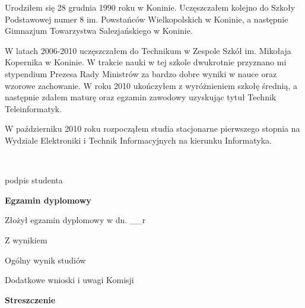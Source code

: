 \begin{titlepage}
    \indent 
    Urodziłem się 28 grudnia 1990 roku w Koninie. Uczęszczałem
    kolejno do Szkoły Podstawowej numer 8 im. Powstańców
    Wielkopolskich w Koninie, a następnie Gimnazjum Towarzystwa
    Salezjańskiego w Koninie.

    \par
    \indent 
    W latach 2006-2010 uczęszczałem do Technikum w Zespole
    Szkół im. Mikołaja Kopernika w Koninie. W trakcie nauki w tej
    szkole dwukrotnie przyznano mi stypendium Prezesa Rady Ministrów
    za bardzo dobre wyniki w nauce oraz wzorowe zachowanie.  W roku
    2010 ukończyłem z wyróżnieniem szkołę średnią, a następnie zdałem
    maturę oraz egzamin zawodowy uzyskując tytuł Technik
    Teleinformatyk.

    \par
    \indent
    W październiku 2010 roku rozpocząłem studia stacjonarne pierwszego stopnia na Wydziale Elektroniki
    i Technik Informacyjnych na kierunku Informatyka.

    \vspace{2\baselineskip}
    \hfill\parbox{15em}{{\small\dotfill}\\[-.3ex]
    \centerline{\footnotesize podpis studenta}}\par
    \vspace{2\baselineskip}
    \begin{center}
 	{\large\bfseries Egzamin dyplomowy} \par\bigskip\bigskip
    \end{center}
    \par\noindent\vspace{1.5\baselineskip}
    Złożył egzamin dyplomowy w dn. \_\_r
    \par\noindent\vspace{1.5\baselineskip}
    Z wynikiem \dotfill
    \par\noindent\vspace{1.5\baselineskip}
    Ogólny wynik studiów \dotfill
    \par\noindent\vspace{1.5\baselineskip}
    Dodatkowe wnioski i uwagi Komisji \dotfill
    \par\noindent\vspace{1.5\baselineskip}
    \dotfill

    \newpage\thispagestyle{empty}
    \vspace*{2\baselineskip}
    \begin{center}
	{\large\bfseries Streszczenie}\par\bigskip
    \end{center}


\end{titlepage}
